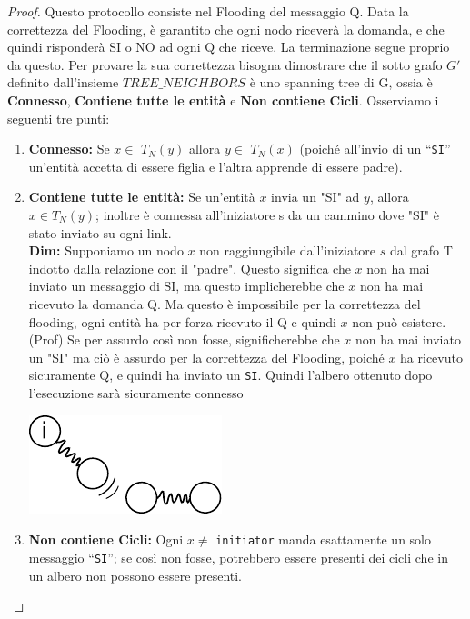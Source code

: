 \begin{proof}
    Questo protocollo consiste nel Flooding del messaggio Q. Data la correttezza
    del Flooding, è garantito che ogni nodo riceverà la domanda, e che quindi
    risponderà SI o NO ad ogni Q che riceve. La terminazione segue proprio da
    questo. Per provare la sua correttezza bisogna dimostrare che il sotto grafo
    $G'$ definito dall'insieme $TREE\_NEIGHBORS$ è uno spanning tree di G, ossia
    è \textbf{Connesso}, \textbf{Contiene tutte le entità} e \textbf{Non
        contiene Cicli}. Osserviamo i seguenti tre punti:
    \begin{enumerate}
        \item \textbf{Connesso:} Se $x \in$ $T_N(y)$ allora $y \in$ $T_N(x)$
              (poiché all'invio di un ``\texttt{SI}'' un'entità accetta di
              essere figlia e l'altra apprende di essere padre).
        \item \textbf{Contiene tutte le entità:} Se un'entità $x$ invia un "SI"
              ad $y$, allora $x \in T_N(y)$; inoltre è connessa all'iniziatore s
              da un cammino dove "SI" è stato inviato su ogni link. \\
              \textbf{Dim:} Supponiamo un nodo $x$ non raggiungibile
              dall'iniziatore $s$ dal grafo T indotto dalla relazione con il
              "padre". Questo significa che $x$ non ha mai inviato un messaggio
              di SI, ma questo implicherebbe che $x$ non ha mai ricevuto la
              domanda Q. Ma questo è impossibile per la correttezza del
              flooding, ogni entità ha per forza ricevuto il Q e quindi $x$ non
              può esistere.\\
              (Prof) Se per assurdo così non fosse, significherebbe che $x$ non
              ha mai inviato un "SI" ma ciò è assurdo per la correttezza del
              Flooding, poiché $x$ ha ricevuto sicuramente Q, e quindi ha
              inviato un \texttt{SI}. Quindi l'albero ottenuto dopo l'esecuzione
              sarà sicuramente connesso
              \begin{center}
                  \includegraphics[scale=1]{capitoli/costruzione-spanning-tree/imgs/n_21}
              \end{center}
        \item \textbf{Non contiene Cicli:} Ogni $x \neq $ \texttt{initiator}
              manda esattamente un solo messaggio ``\texttt{SI}''; se così non
              fosse, potrebbero essere presenti dei cicli che in un albero non
              possono essere presenti.
    \end{enumerate}
\end{proof}

